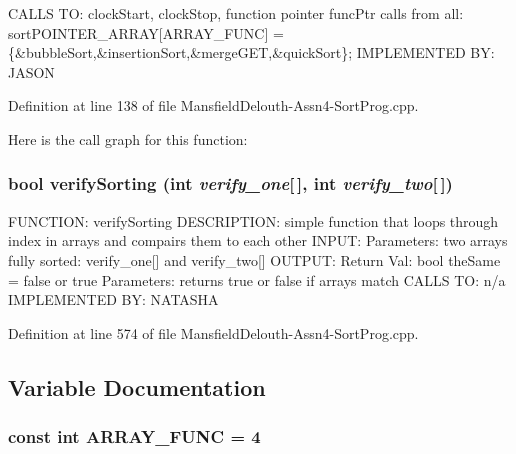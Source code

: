 CALLS TO: clockStart, clockStop, function pointer funcPtr calls from all: sortPOINTER\_\-ARRAY\mbox{[}ARRAY\_\-FUNC\mbox{]} = \{\&bubbleSort,\&insertionSort,\&mergeGET,\&quickSort\}; IMPLEMENTED BY: JASON 

Definition at line 138 of file MansfieldDelouth-\/Assn4-\/SortProg.cpp.



Here is the call graph for this function:

\hypertarget{_mansfield_delouth-_assn4-_sort_prog_8cpp_ae2cf0cca1e089e83ae98750b96b8cf11}{
\subsubsection[{verifySorting}]{\setlength{\rightskip}{0pt plus 5cm}bool verifySorting (int {\em verify\_\-one}\mbox{[}$\,$\mbox{]}, \/  int {\em verify\_\-two}\mbox{[}$\,$\mbox{]})}}
\label{_mansfield_delouth-_assn4-_sort_prog_8cpp_ae2cf0cca1e089e83ae98750b96b8cf11}
FUNCTION: verifySorting DESCRIPTION: simple function that loops through index in arrays and compairs them to each other INPUT: Parameters: two arrays fully sorted: verify\_\-one\mbox{[}\mbox{]} and verify\_\-two\mbox{[}\mbox{]} OUTPUT: Return Val: bool theSame = false or true Parameters: returns true or false if arrays match CALLS TO: n/a IMPLEMENTED BY: NATASHA 

Definition at line 574 of file MansfieldDelouth-\/Assn4-\/SortProg.cpp.



\subsection{Variable Documentation}
\hypertarget{_mansfield_delouth-_assn4-_sort_prog_8cpp_a3b95dd60d5c45f7cc3733769f3d54868}{
\subsubsection[{ARRAY\_\-FUNC}]{\setlength{\rightskip}{0pt plus 5cm}const int {\bf ARRAY\_\-FUNC} = 4}}
\label{_mansfield_delouth-_assn4-_sort_prog_8cpp_a3b95dd60d5c45f7cc3733769f3d54868}


